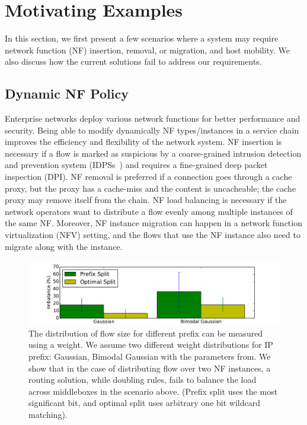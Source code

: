 \section{Motivating Examples}

In this section, we first present a few scenarios where a system may require network function (NF) insertion, removal, or migration, and host mobility. We also discuss how the current solutions fail to address our requirements.


\subsection{Dynamic NF Policy}
Enterprise networks deploy various network functions for better performance and security. Being able to modify dynamically NF types/instances in a service chain improves the efficiency and flexibility of the network system. NF insertion is necessary if a flow is marked as suspicious by a coarse-grained intrusion detection and prevention system (IDPSs~\cite{IPS}) and requires a fine-grained deep packet inspection (DPI). NF removal is preferred if a connection goes through a cache proxy, but the proxy has a cache-miss and the content is uncacheable; the cache proxy may remove itself from the chain. NF load balancing is necessary if the network operators want to distribute a flow evenly among multiple instances of the same NF. Moreover, NF instance migration can happen in a network function virtualization (NFV) setting, and the flows that use the NF instance also need to migrate along with the instance. 

\begin{figure}[ht]
\centering
\includegraphics[width=\linewidth]{figures/routingsucks.pdf} 
\caption{\small The distribution of flow size for different prefix can be
measured using a weight\protect\cite{Niagara}. We assume two different weight
distributions for IP prefix: Gaussian, Bimodal  Gaussian with the parameters from\protect\cite{Niagara}. 
We show that in the  case of distributing flow over two  NF instances, a
routing solution, while doubling rules, fails to balance the load across middleboxes in the scenario
above. (Prefix split uses the most significant bit, and optimal split uses arbitrary one bit wildcard matching).} \label{distribution}
\end{figure}
% 


